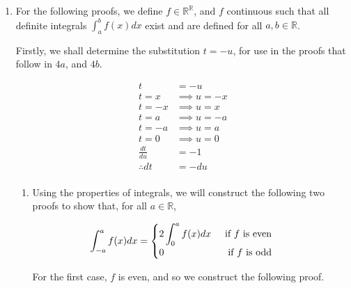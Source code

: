\documentclass[a4paper]{article}
\begin{document}
\begin{enumerate}[label=\textbf{\arabic*.}]
	\pagebreak

	\item For the following proofs, we define $\displaystyle{f \in \mathbb{R}^{\mathbb{R}}}$, and $f$ continuous such that all definite integrals $\displaystyle{\int_{a}^{b}f(x)dx}$ exist and are defined for all  $\displaystyle{a,b \in \mathbb{R}}$.

	\bigbreak

	Firstly, we shall determine the substitution $\displaystyle{t=-u}$, for use in the proofs that follow in $\displaystyle{4a}$, and $\displaystyle{4b}$.

		\begin{align*}
		t & = -u\\
		t = x & \implies u = -x\\
		t = -x & \implies u = x\\
		t = a & \implies u = -a\\
		t = -a & \implies u = a\\
		t = 0 & \implies u = 0\\
		\frac{dt}{du} & = -1\\
		\therefore dt & = -du\\
		\end{align*}

	\begin{enumerate}

		\item Using the properties of integrals, we will construct the following two proofs to show that, for all $\displaystyle{a \in \mathbb{R}}$,

		\begin{align*}
		\int_{-a}^{a}f(x)dx & = 
		\begin{cases}
		\displaystyle{2\int_{0}^{a}f(x)dx} \hspace{5mm} \text{if $f$ is even}\\
		\displaystyle{0} \hfill \text{if $f$ is odd}\\
		\end{cases}
		\end{align*}

		\bigbreak

		For the first case, $f$ is even, and so we construct the following proof.


\end{enumerate}
\end{enumerate}
\end{document}
